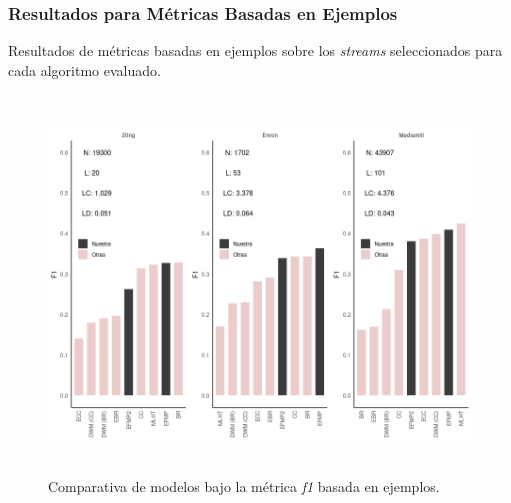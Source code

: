 \subsubsection{Resultados para Métricas Basadas en Ejemplos}

\begin{table}[htbp]
	\centering
	\begin{adjustbox}{max width=\textwidth}
		
	\end{adjustbox}
	\begin{adjustbox}{max width=\textwidth}
		
	\end{adjustbox}
	\caption{Resultados de métricas basadas en ejemplos sobre los
		\textit{streams} seleccionados para cada algoritmo evaluado.}
	\label{tab:example_based}
\end{table}

\begin{figure}
	\includegraphics[width=\linewidth,height=10cm]{figures/experiments/classification/f1_ex.png}
	\caption{Comparativa de modelos bajo la métrica \textit{f1} basada en
		ejemplos.}
	\label{fig:comparativa_f1_ex}
\end{figure}

